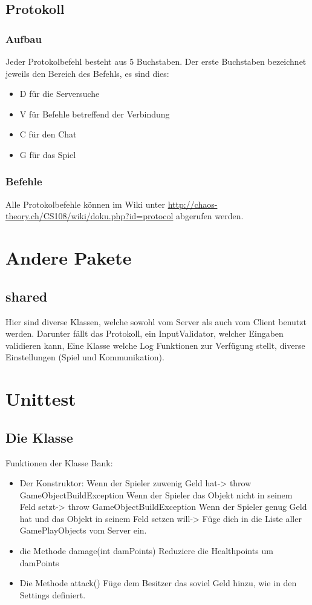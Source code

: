 \documentclass[ngerman, 12pt, pdftex]{scrartcl}[2006/07/30]
\begin{document}
\subsection{Protokoll}
\subsubsection{Aufbau}
Jeder Protokolbefehl besteht aus 5 Buchstaben. Der erste Buchstaben bezeichnet jeweils den Bereich des Befehls, es sind dies:
\begin{itemize}
\item D für die Serversuche
\item V für Befehle betreffend der Verbindung
\item C für den Chat
\item G für das Spiel
\end{itemize}
\subsubsection{Befehle}
Alle Protokolbefehle können im Wiki unter \url{http://chaos-theory.ch/CS108/wiki/doku.php?id=protocol} abgerufen werden.

\section{Andere Pakete}
\subsection{shared}
Hier sind diverse Klassen, welche sowohl vom Server als auch vom Client benutzt werden.
Darunter fällt das Protokoll, ein InputValidator, welcher Eingaben validieren kann, Eine Klasse welche Log Funktionen zur Verfügung stellt,
diverse Einstellungen (Spiel und Kommunikation).

\section{Unittest}
\subsection{Die Klasse}
Funktionen der Klasse Bank:
\begin{itemize}
\item Der Konstruktor: 
\subitem Wenn der Spieler zuwenig Geld hat-> throw GameObjectBuildException
\subitem Wenn der Spieler das Objekt nicht in seinem Feld setzt-> throw GameObjectBuildException
\subitem Wenn der Spieler genug Geld hat und das Objekt in seinem Feld setzen will-> F\"{u}ge dich in die Liste aller GamePlayObjects vom Server ein.
\item die Methode damage(int damPoints)
\subitem Reduziere die Healthpoints um damPoints
\item Die Methode attack()
\subitem F\"{u}ge dem Besitzer das soviel Geld hinzu, wie in den Settings definiert.
\end{itemize}
\end{document}
